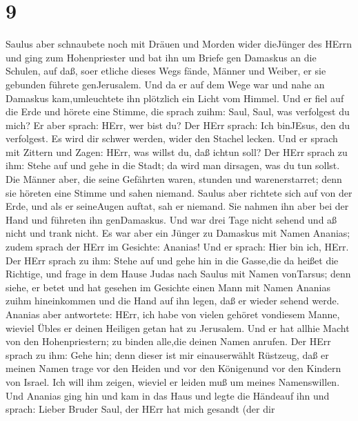 \hypertarget{section-8}{%
\section{9}\label{section-8}}

 Saulus aber schnaubete noch mit Dräuen und Morden wider
dieJünger des HErrn und ging zum Hohenpriester  und bat ihn
um Briefe gen Damaskus an die Schulen, auf daß, soer etliche dieses Wegs
fände, Männer und Weiber, er sie gebunden führete genJerusalem.
 Und da er auf dem Wege war und nahe an Damaskus
kam,umleuchtete ihn plötzlich ein Licht vom Himmel.  Und er
fiel auf die Erde und hörete eine Stimme, die sprach zuihm: Saul, Saul,
was verfolgest du mich?  Er aber sprach: HErr, wer bist du?
Der HErr sprach: Ich binJEsus, den du verfolgest. Es wird dir schwer
werden, wider den Stachel lecken.  Und er sprach mit Zittern
und Zagen: HErr, was willst du, daß ichtun soll? Der HErr sprach zu ihm:
Stehe auf und gehe in die Stadt; da wird man dirsagen, was du tun
sollst.  Die Männer aber, die seine Gefährten waren, stunden
und warenerstarret; denn sie höreten eine Stimme und sahen niemand.
 Saulus aber richtete sich auf von der Erde, und als er
seineAugen auftat, sah er niemand. Sie nahmen ihn aber bei der Hand und
führeten ihn genDamaskus.  Und war drei Tage nicht sehend
und aß nicht und trank nicht.  Es war aber ein Jünger zu
Damaskus mit Namen Ananias; zudem sprach der HErr im Gesichte: Ananias!
Und er sprach: Hier bin ich, HErr.  Der HErr sprach zu ihm:
Stehe auf und gehe hin in die Gasse,die da heißet die Richtige, und
frage in dem Hause Judas nach Saulus mit Namen vonTarsus; denn siehe, er
betet  und hat gesehen im Gesichte einen Mann mit Namen
Ananias zuihm hineinkommen und die Hand auf ihn legen, daß er wieder
sehend werde.  Ananias aber antwortete: HErr, ich habe von
vielen gehöret vondiesem Manne, wieviel Übles er deinen Heiligen getan
hat zu Jerusalem.  Und er hat allhie Macht von den
Hohenpriestern; zu binden alle,die deinen Namen anrufen. 
Der HErr sprach zu ihm: Gehe hin; denn dieser ist mir einauserwählt
Rüstzeug, daß er meinen Namen trage vor den Heiden und vor den
Königenund vor den Kindern von Israel.  Ich will ihm
zeigen, wieviel er leiden muß um meines Namenswillen.  Und
Ananias ging hin und kam in das Haus und legte die Händeauf ihn und
sprach: Lieber Bruder Saul, der HErr hat mich gesandt (der dir
